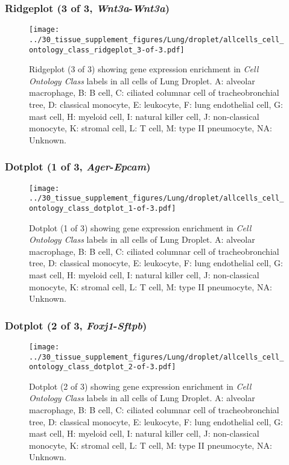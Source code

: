 \clearpage

\subsubsection{Ridgeplot (3 of 3, \emph{Wnt3a}-\emph{Wnt3a})}
\begin{figure}[h]
\centering
\texttt{[image: ../30\_tissue\_supplement\_figures/Lung/droplet/allcells\_cell\_ontology\_class\_ridgeplot\_3-of-3.pdf]}

\caption{ Ridgeplot (3 of 3)  showing gene expression enrichment in \emph{Cell Ontology Class} labels in all cells of Lung Droplet. A: alveolar macrophage, B: B cell, C: ciliated columnar cell of tracheobronchial tree, D: classical monocyte, E: leukocyte, F: lung endothelial cell, G: mast cell, H: myeloid cell, I: natural killer cell, J: non-classical monocyte, K: stromal cell, L: T cell, M: type II pneumocyte, NA: Unknown.}
\end{figure}


\clearpage

\subsubsection{Dotplot (1 of 3, \emph{Ager}-\emph{Epcam})}
\begin{figure}[h]
\centering
\texttt{[image: ../30\_tissue\_supplement\_figures/Lung/droplet/allcells\_cell\_ontology\_class\_dotplot\_1-of-3.pdf]}

\caption{ Dotplot (1 of 3)  showing gene expression enrichment in \emph{Cell Ontology Class} labels in all cells of Lung Droplet. A: alveolar macrophage, B: B cell, C: ciliated columnar cell of tracheobronchial tree, D: classical monocyte, E: leukocyte, F: lung endothelial cell, G: mast cell, H: myeloid cell, I: natural killer cell, J: non-classical monocyte, K: stromal cell, L: T cell, M: type II pneumocyte, NA: Unknown.}
\end{figure}


\clearpage

\subsubsection{Dotplot (2 of 3, \emph{Foxj1}-\emph{Sftpb})}
\begin{figure}[h]
\centering
\texttt{[image: ../30\_tissue\_supplement\_figures/Lung/droplet/allcells\_cell\_ontology\_class\_dotplot\_2-of-3.pdf]}

\caption{ Dotplot (2 of 3)  showing gene expression enrichment in \emph{Cell Ontology Class} labels in all cells of Lung Droplet. A: alveolar macrophage, B: B cell, C: ciliated columnar cell of tracheobronchial tree, D: classical monocyte, E: leukocyte, F: lung endothelial cell, G: mast cell, H: myeloid cell, I: natural killer cell, J: non-classical monocyte, K: stromal cell, L: T cell, M: type II pneumocyte, NA: Unknown.}
\end{figure}


